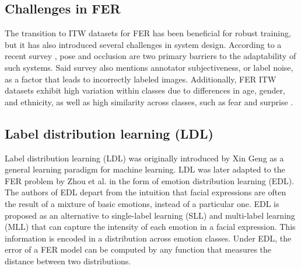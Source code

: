 \documentclass[../main.tex]{subfiles}
\begin{document}
\subsection{Challenges in FER}

The transition to ITW datasets for FER has been beneficial for robust training, but it has also introduced several challenges in system design. 
According to a recent survey \cite{karnati2023survey}, pose and occlusion are two primary barriers to the adaptability of such systems. 
Said survey \cite{karnati2023survey} also mentions annotator subjectiveness, or label noise, as a factor that leads to incorrectly labeled images.
Additionally, FER ITW datasets exhibit high variation within classes due to differences in age, gender, and ethnicity, as well as high similarity across classes, such as fear and surprise \cite{li2022survey, farzaneh2021loss, fard2022adcorre}.

\subsection{Label distribution learning (LDL)}

Label distribution learning (LDL) was originally introduced by Xin Geng \cite{geng2016ldl} as a general learning paradigm for machine learning.
LDL was later adapted to the FER problem by Zhou et al. \cite{zhou2015edl} in the form of emotion distribution learning (EDL).\\

The authors of EDL depart from the intuition that facial expressions are often the result of a mixture of basic emotions, instead of a particular one.
EDL is proposed as an alternative to single-label learning (SLL) and multi-label learning (MLL) that can capture the intensity of each emotion in a facial expression.
This information is encoded in a distribution across emotion classes.
Under EDL, the error of a FER model can be computed by any function that measures the distance between two distributions.\\

\end{document}

